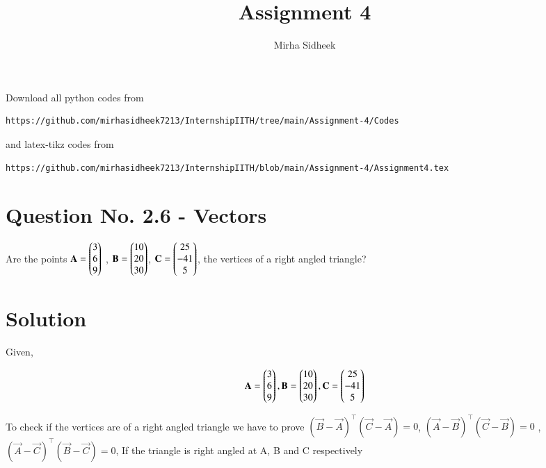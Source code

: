 \documentclass[journal,12pt,twocolumn]{IEEEtran}
\begin{document}
     \def\centbox#1{\makebox[0in]{#1}}
     \def\topbox#1{\raisebox{-\baselineskip}[0in][0in]{#1}}
     \def\midbox#1{\raisebox{-0.5\baselineskip}[0in][0in]{#1}}
\vspace{3cm}
\title{Assignment 4}
\author{Mirha Sidheek}
\maketitle
\newpage
\bigskip
\renewcommand{\thefigure}{\theenumi}
\renewcommand{\thetable}{\theenumi}
Download all python codes from 
\begin{lstlisting}
https://github.com/mirhasidheek7213/InternshipIITH/tree/main/Assignment-4/Codes
\end{lstlisting}

%
and latex-tikz codes from 
%
\begin{lstlisting}
https://github.com/mirhasidheek7213/InternshipIITH/blob/main/Assignment-4/Assignment4.tex
\end{lstlisting}

\section{\textbf{Question No. 2.6 - Vectors}}

 Are the points $\mathbf{A} = \begin{pmatrix}3\\6\\9\end{pmatrix}$ , $\mathbf{B} = \begin{pmatrix}10\\20\\30\end{pmatrix}$, $\mathbf{C} = \begin{pmatrix}25\\-41\\5\end{pmatrix}$, 
the vertices of a right angled triangle?
 
%

\section{\textbf {Solution}}
Given, 

\begin{align}
   \mathbf{A} = \begin{pmatrix}3\\6\\9\end{pmatrix} , \mathbf{B} = \begin{pmatrix}10\\20\\30\end{pmatrix}, \mathbf{C} = \begin{pmatrix}25\\-41\\5\end{pmatrix} 
\end{align}

To check if the vertices are of a right angled triangle we have to prove $(\vec{B}-\vec{A})^\top(\vec{C}-\vec{A})=0$, $(\vec{A}-\vec{B})^\top(\vec{C}-\vec{B})=0$ ,$(\vec{A}-\vec{C})^\top(\vec{B}-\vec{C})=0$, If the triangle is right angled at A, B and C respectively
\\
\\
\end{document}
